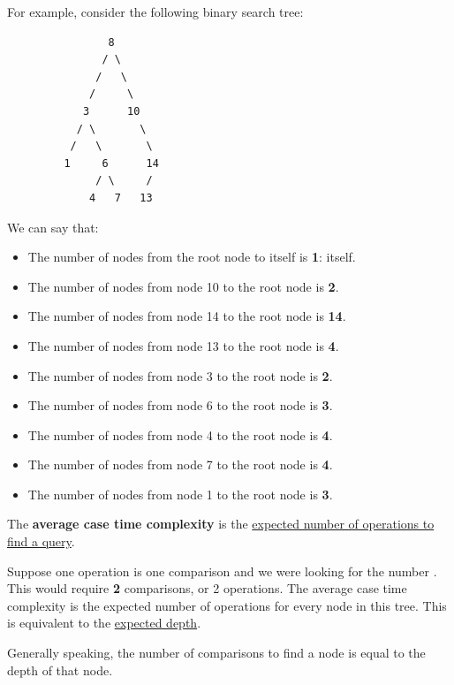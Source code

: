 \documentclass[letterpaper]{article}
\begin{document}
For example, consider the following binary search tree: 
\begin{verbatim}
                8 
               / \ 
              /   \ 
             /     \ 
            3      10
           / \       \ 
          /   \       \ 
         1     6      14
              / \     /
             4   7   13
\end{verbatim}
We can say that: 
\begin{itemize}
    \item The number of nodes from the root node to itself is \textbf{1}: itself. 
    \item The number of nodes from node 10 to the root node is \textbf{2}. 
    \item The number of nodes from node 14 to the root node is \textbf{14}.
    \item The number of nodes from node 13 to the root node is \textbf{4}. 
    \item The number of nodes from node 3 to the root node is \textbf{2}.
    \item The number of nodes from node 6 to the root node is \textbf{3}. 
    \item The number of nodes from node 4 to the root node is \textbf{4}. 
    \item The number of nodes from node 7 to the root node is \textbf{4}. 
    \item The number of nodes from node 1 to the root node is \textbf{3}. 
\end{itemize}
The \textbf{average case time complexity} is the \underline{expected number of operations to find a query}. 

\bigskip 

Suppose one operation is one comparison and we were looking for the number . This would require \textbf{2} comparisons, or 2 operations. The average case time complexity is the expected number of operations for every node in this tree. This is equivalent to the \underline{expected depth}. 

\bigskip 

Generally speaking, the number of comparisons to find a node is equal to the depth of that node. 
\end{document}
